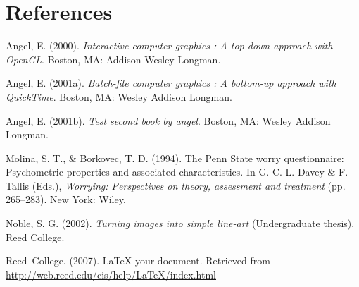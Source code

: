 \documentclass[
  letterpaper,
  12pt,
  twoside]{book}
\newlength{\cslhangindent}
\newenvironment{CSLReferences}[2] %
 {\begin{list}{}{%
  \setlength{\itemindent}{0pt}
  \setlength{\leftmargin}{0pt}
  \setlength{\parsep}{0pt}
  \ifodd #1
   \setlength{\leftmargin}{\cslhangindent}
   \setlength{\itemindent}{-1\cslhangindent}
  \fi
  \setlength{\itemsep}{#2\baselineskip}}}
 {\end{list}}
\begin{document}

\chapter*{References}\label{references}


\backmatter


\noindent

\setlength{\parindent}{-0.20in}
\setlength{\leftskip}{0.20in}
\setlength{\parskip}{8pt}

\label{refs}
\begin{CSLReferences}{1}{0}
Angel, E. (2000). \emph{Interactive computer graphics : A top-down
approach with OpenGL}. Boston, MA: Addison Wesley Longman.

Angel, E. (2001a). \emph{Batch-file computer graphics : A bottom-up
approach with QuickTime}. Boston, MA: Wesley Addison Longman.

Angel, E. (2001b). \emph{Test second book by angel}. Boston, MA: Wesley
Addison Longman.

Molina, S. T., \& Borkovec, T. D. (1994). The {P}enn {S}tate worry
questionnaire: Psychometric properties and associated characteristics.
In G. C. L. Davey \& F. Tallis (Eds.), \emph{Worrying: Perspectives on
theory, assessment and treatment} (pp. 265--283). New York: Wiley.

Noble, S. G. (2002). \emph{Turning images into simple line-art}
(Undergraduate thesis). Reed College.

Reed~College. (2007). LaTeX your document. Retrieved from
\url{http://web.reed.edu/cis/help/LaTeX/index.html}

\end{CSLReferences}


\backmatter
\end{document}
